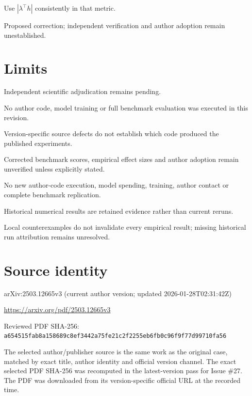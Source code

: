 \documentclass[11pt]{article}
\begin{document}
Use \(|\lambda^\top h|\) consistently in that metric.

Proposed correction; independent verification and author adoption remain unestablished.

\section*{Limits}

Independent scientific adjudication remains pending.\par

No author code, model training or full benchmark evaluation was executed in this revision.\par

Version-specific source defects do not establish which code produced the published experiments.\par

Corrected benchmark scores, empirical effect sizes and author adoption remain unverified unless explicitly stated.\par

No new author-code execution, model spending, training, author contact or complete benchmark replication.\par

Historical numerical results are retained evidence rather than current reruns.\par

Local counterexamples do not invalidate every empirical result; missing historical run attribution remains unresolved.\par

\section*{Source identity}

arXiv:2503.12665v3 (current author version; updated 2026-01-28T02:31:42Z)

\url{https://arxiv.org/pdf/2503.12665v3}

Reviewed PDF SHA-256: \nolinkurl{a654515fab8a158689c8ef3442a75fe21c2f2255eb6fb0c96f9f77d99710fa56}

The selected author/publisher source is the same work as the original case, matched by exact title, author identity and official version channel. The exact selected PDF SHA-256 was recomputed in the latest-version pass for Issue \#27. The PDF was downloaded from its version-specific official URL at the recorded time.
\end{document}
